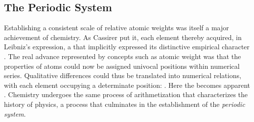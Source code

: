 \documentclass[submitted,12pt]{article}
\begin{document}
\subsection{The Periodic System}

Establishing a consistent scale of relative atomic weights was itself a major achievement of chemistry. As Cassirer put it, each element thereby acquired, in Leibniz’s expression, a  that implicitly expressed its distinctive empirical character . The real advance represented by concepts such as atomic weight was that the properties of atoms could now be assigned univocal positions within numerical series. Qualitative differences could thus be translated into numerical relations, with each element occupying a determinate position:  . Here the   becomes apparent . Chemistry undergoes the same process of arithmetization that characterizes the history of physics, a process that culminates in the establishment of the \emph{periodic system}.

\end{document}
